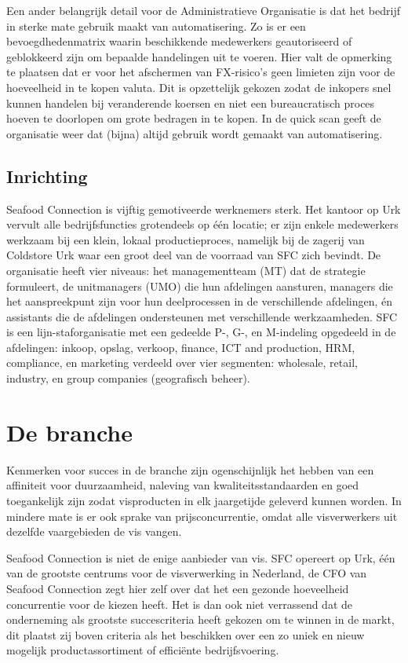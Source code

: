 \documentclass[10pt,a4paper,oneside]{report}
\begin{document}
Een ander belangrijk detail voor de Administratieve Organisatie is dat het bedrijf in sterke mate gebruik maakt van automatisering. Zo is er een bevoegdhedenmatrix waarin beschikkende medewerkers geautoriseerd of geblokkeerd zijn om bepaalde handelingen uit te voeren. Hier valt de opmerking te plaatsen dat er voor het afschermen van FX-risico's geen limieten zijn voor de hoeveelheid in te kopen valuta. Dit is opzettelijk gekozen zodat de inkopers snel kunnen handelen bij veranderende koersen en niet een bureaucratisch proces hoeven te doorlopen om grote bedragen in te kopen. In de quick scan geeft de organisatie weer dat (bijna) altijd gebruik wordt gemaakt van automatisering. \citep{quickscan}

\subsection{Inrichting}
Seafood Connection is vijftig gemotiveerde werknemers sterk. Het kantoor op Urk vervult alle bedrijfsfuncties grotendeels op één locatie; er zijn enkele medewerkers werkzaam bij een klein, lokaal productieproces, namelijk bij de zagerij van Coldstore Urk waar een groot deel van de voorraad van SFC zich bevindt. De organisatie heeft vier niveaus: het managementteam (MT) dat de strategie formuleert, de unitmanagers (UMO) die hun afdelingen aansturen, managers die het aanspreekpunt zijn voor hun deelprocessen in de verschillende afdelingen, én assistants die de afdelingen ondersteunen met verschillende werkzaamheden. SFC is een lijn-staforganisatie met een gedeelde P-, G-, en M-indeling opgedeeld in de afdelingen: inkoop, opslag, verkoop, finance, ICT and production, HRM, compliance, en marketing verdeeld over vier segmenten: wholesale, retail, industry, en group companies (geografisch beheer). \citep{quickscan}
    \section{De branche}
Kenmerken voor succes in de branche zijn ogenschijnlijk het hebben van een affiniteit voor duurzaamheid, naleving van kwaliteitsstandaarden en goed toegankelijk zijn zodat visproducten in elk jaargetijde geleverd kunnen worden. In mindere mate is er ook sprake van prijsconcurrentie, omdat alle visverwerkers uit dezelfde vaargebieden de vis vangen. 

Seafood Connection is niet de enige aanbieder van vis. SFC opereert op Urk, één van de grootste centrums voor de visverwerking in Nederland, de CFO van Seafood Connection zegt hier zelf over dat het een gezonde hoeveelheid concurrentie voor de kiezen heeft. Het is dan ook niet verrassend dat de onderneming als grootste succescriteria heeft gekozen om te winnen in de markt, dit plaatst zij boven criteria als het beschikken over een zo uniek en nieuw mogelijk productassortiment of efficiënte bedrijfsvoering. 
\end{document}
